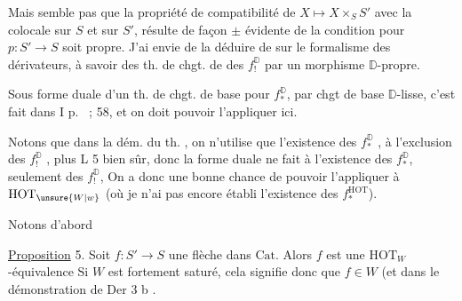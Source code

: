 Mais   semble pas que la propriété de compatibilité de $X\longmapsto X\times_S S'$ avec la  colocale sur $S$ et sur $S'$, résulte de façon $\pm$ évidente de la condition pour $p:S'\longrightarrow S$ soit propre. J'ai envie de la déduire de  sur le formalisme des dérivateurs, à savoir des th. de chgt. de  des $f_!^{\mathbb D}$ par un morphisme $\mathbb D$-propre.



Sous forme duale d'un th. de chgt. de base pour $f_*^{\mathbb D}$, par chgt de base $\mathbb D$-lisse, c'est fait dans I p.~ ; 58, et on doit pouvoir l'appliquer ici.

 Notons que dans la dém. du th. , on n'utilise que l'existence des $f_*^{\mathbb D}$ , à l'exclusion des $f_!^{\mathbb D}$ , plus L 5 bien sûr, donc la forme duale ne  fait  à l'existence des $f_*^{\mathbb D}$, seulement des $f_!^{\mathbb D}$, On a donc une bonne chance de pouvoir l'appliquer à $\mathrm{HOT}_{\unsure{W|w}}$ (où je n'ai pas encore établi l'existence des $f_*^{\mathrm{HOT}}$).

Notons d'abord


\uline{Proposition} 5. Soit $f:S'\longrightarrow S$ une flèche dans $\mathrm{Cat}$. Alors $f$ est une $\mathrm{HOT}_W$-équivalence    Si $W$ est fortement saturé, cela signifie donc que  $f\in W$ (et \unsure{$=$}   dans le \unsure{$+$} démonstration de Der 3 b .


